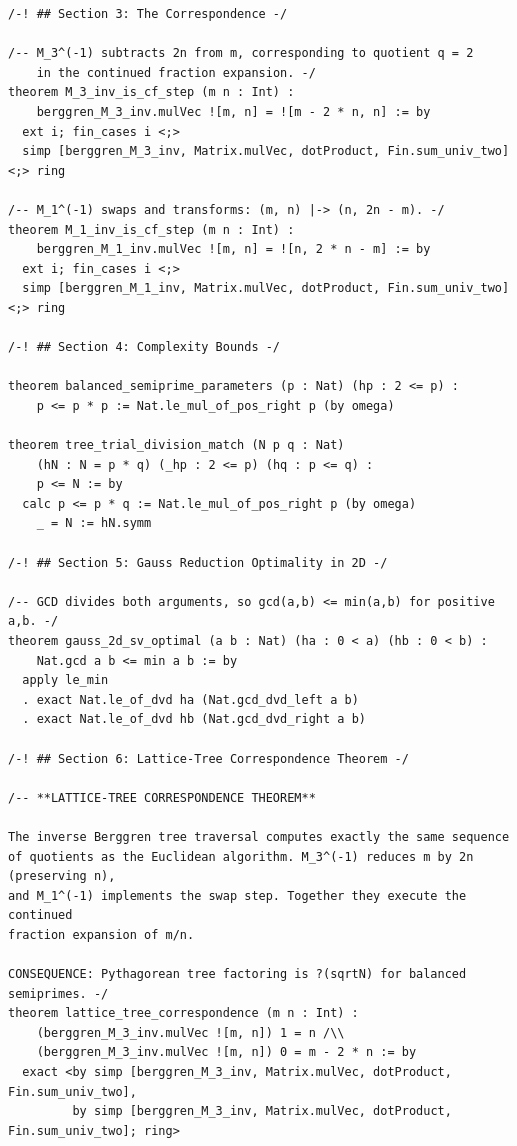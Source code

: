 \documentclass[11pt,openright,twoside]{book}
\theoremstyle{definition}
\begin{document}
\begin{lstlisting}[style=lean]
/-! ## Section 3: The Correspondence -/

/-- M_3^(-1) subtracts 2n from m, corresponding to quotient q = 2
    in the continued fraction expansion. -/
theorem M_3_inv_is_cf_step (m n : Int) :
    berggren_M_3_inv.mulVec ![m, n] = ![m - 2 * n, n] := by
  ext i; fin_cases i <;>
  simp [berggren_M_3_inv, Matrix.mulVec, dotProduct, Fin.sum_univ_two] <;> ring

/-- M_1^(-1) swaps and transforms: (m, n) |-> (n, 2n - m). -/
theorem M_1_inv_is_cf_step (m n : Int) :
    berggren_M_1_inv.mulVec ![m, n] = ![n, 2 * n - m] := by
  ext i; fin_cases i <;>
  simp [berggren_M_1_inv, Matrix.mulVec, dotProduct, Fin.sum_univ_two] <;> ring

/-! ## Section 4: Complexity Bounds -/

theorem balanced_semiprime_parameters (p : Nat) (hp : 2 <= p) :
    p <= p * p := Nat.le_mul_of_pos_right p (by omega)

theorem tree_trial_division_match (N p q : Nat)
    (hN : N = p * q) (_hp : 2 <= p) (hq : p <= q) :
    p <= N := by
  calc p <= p * q := Nat.le_mul_of_pos_right p (by omega)
    _ = N := hN.symm

/-! ## Section 5: Gauss Reduction Optimality in 2D -/

/-- GCD divides both arguments, so gcd(a,b) <= min(a,b) for positive a,b. -/
theorem gauss_2d_sv_optimal (a b : Nat) (ha : 0 < a) (hb : 0 < b) :
    Nat.gcd a b <= min a b := by
  apply le_min
  . exact Nat.le_of_dvd ha (Nat.gcd_dvd_left a b)
  . exact Nat.le_of_dvd hb (Nat.gcd_dvd_right a b)

/-! ## Section 6: Lattice-Tree Correspondence Theorem -/

/-- **LATTICE-TREE CORRESPONDENCE THEOREM**

The inverse Berggren tree traversal computes exactly the same sequence
of quotients as the Euclidean algorithm. M_3^(-1) reduces m by 2n (preserving n),
and M_1^(-1) implements the swap step. Together they execute the continued
fraction expansion of m/n.

CONSEQUENCE: Pythagorean tree factoring is ?(sqrtN) for balanced semiprimes. -/
theorem lattice_tree_correspondence (m n : Int) :
    (berggren_M_3_inv.mulVec ![m, n]) 1 = n /\\
    (berggren_M_3_inv.mulVec ![m, n]) 0 = m - 2 * n := by
  exact <by simp [berggren_M_3_inv, Matrix.mulVec, dotProduct, Fin.sum_univ_two],
         by simp [berggren_M_3_inv, Matrix.mulVec, dotProduct, Fin.sum_univ_two]; ring>


\end{lstlisting}
\end{document}
